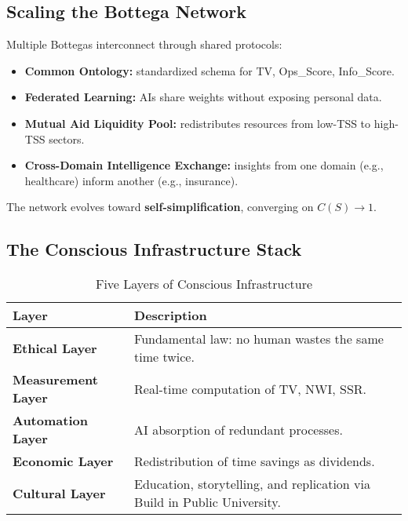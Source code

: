 \subsection{Scaling the Bottega Network}
\label{sec:scaling-network}

Multiple Bottegas interconnect through shared protocols:

\begin{itemize}
    \item \textbf{Common Ontology:} standardized schema for TV, Ops\_Score, Info\_Score.
    \item \textbf{Federated Learning:} AIs share weights without exposing personal data.
    \item \textbf{Mutual Aid Liquidity Pool:} redistributes resources from low-TSS to high-TSS sectors.
    \item \textbf{Cross-Domain Intelligence Exchange:} insights from one domain (e.g., healthcare) inform another (e.g., insurance).
\end{itemize}

The network evolves toward \textbf{self-simplification}, converging on $C(S) \to 1$.

\subsection{The Conscious Infrastructure Stack}
\label{sec:infrastructure-stack}

\begin{table}[h]
\centering
\caption{Five Layers of Conscious Infrastructure}
\label{tab:infrastructure-stack}
\begin{tabular}{p{3.5cm}p{9cm}}
\toprule
\textbf{Layer} & \textbf{Description} \\
\midrule
\textbf{Ethical Layer} & Fundamental law: no human wastes the same time twice. \\
\textbf{Measurement Layer} & Real-time computation of TV, NWI, SSR. \\
\textbf{Automation Layer} & AI absorption of redundant processes. \\
\textbf{Economic Layer} & Redistribution of time savings as dividends. \\
\textbf{Cultural Layer} & Education, storytelling, and replication via Build in Public University. \\
\bottomrule
\end{tabular}
\end{table}

